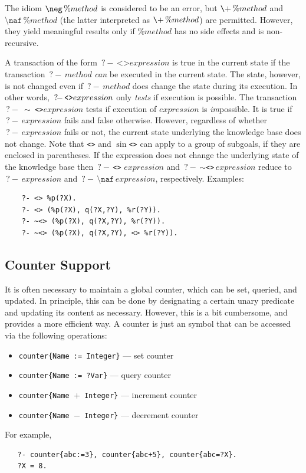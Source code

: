 \documentclass[11pt]{article}
\newcommand{\ERGO}{\mbox{\smaller{\ensuremath{\cal{E}}\smaller{{\sc{RGO}}}}}\xspace}
\newcommand{\FLSYSTEM}{\ERGO}
\newcommand{\query}{\mbox{$\, ?\! - \, $}}                  %
\newcommand{\bs}{\textbackslash}
\newcommand{\PLGNAF}{\mbox{\texttt{\bs}+}\xspace}
\newcommand{\RULELOGNAF}{{\texttt{{\bs}naf}}\xspace}
\newcommand{\RULELOGNEG}{{\texttt{{\bs}neg}}\xspace}
\begin{document}
The idiom ${\tt \RULELOGNEG}\,\%method$ is considered to be an error, but
$\PLGNAF\,\%method$ and $\RULELOGNAF\,\%method$ (the latter interpreted as
$\PLGNAF\,\%method$) are permitted. However, they yield meaningful results only
if $\%method$ has no side effects and is non-recursive.

A transaction of the form $\query \texttt{<>} expression$ is true in the current
state if the transaction $\query method$ \emph{can} be executed in the current
state. The state, however, is not changed even if  $\query method$
does change the state during its execution. In other words, $\texttt{\query <>}
expression$ only \emph{tests} if execution is possible.
The transaction \texttt{\query} \texttt{$\sim$ <>}$expression$ tests if execution of
$expression$ is \emph{im}possible. It is true if $\query expression$ fails
and false otherwise. However, regardless of whether $\query expression$
fails or not, the current state underlying the knowledge base does not
change.
Note that \texttt{<>} and \texttt{$\sin$<>} can apply to a group of
subgoals, if they are enclosed in parentheses.  If the expression does not
change the underlying state of the knowledge base then
\texttt{\query <>} $expression$ and \query\texttt{$\sim$<>}\,$expression$ reduce to
$\query expression$ and $\query \RULELOGNAF\,expression$, respectively.
Examples:
\begin{verbatim}
    ?- <> %p(?X).
    ?- <> (%p(?X), q(?X,?Y), %r(?Y)).
    ?- ~<> (%p(?X), q(?X,?Y), %r(?Y)).
    ?- ~<> (%p(?X), q(?X,?Y), <> %r(?Y)).
\end{verbatim}





\subsection{Counter Support}

It is often necessary to maintain a global counter, which can be set,
queried, and updated. In principle, this can be done
by designating a certain unary predicate and updating its content as necessary.
However, this is a bit cumbersome, and \FLSYSTEM provides a more efficient
way. A counter is just an \FLSYSTEM symbol that can be accessed via the
following operations:

\begin{itemize}
\item \texttt{counter\{Name := Integer\}} --- set counter
\item \texttt{counter\{Name := ?Var\}} --- query counter
\item \texttt{counter\{Name $+$ Integer\}} --- increment counter
\item \texttt{counter\{Name $-$ Integer\}} --- decrement counter
\end{itemize}
For example,
\begin{verbatim}
   ?- counter{abc:=3}, counter{abc+5}, counter{abc=?X}.
   ?X = 8.
\end{verbatim}
\end{document}
